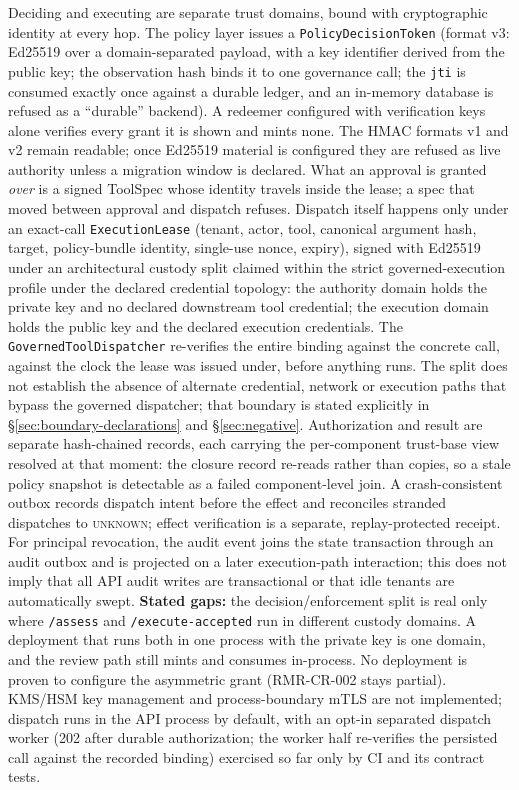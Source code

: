\documentclass[10pt,twocolumn]{article}
\begin{document}
Deciding and executing are separate trust domains, bound with
cryptographic identity at every hop. The policy layer issues a
\texttt{PolicyDecisionToken} (format v3: Ed25519 over a domain-separated
payload, with a key identifier derived from the public key; the observation
hash binds it to one governance call; the \texttt{jti} is consumed exactly
once against a durable ledger, and an in-memory database is refused as a
``durable'' backend). A redeemer configured with verification keys alone
verifies every grant it is shown and mints none. The HMAC formats v1 and v2
remain readable; once Ed25519 material is configured they are refused as
live authority unless a migration window is declared. What an approval is granted \emph{over} is a signed ToolSpec
whose identity travels inside the lease; a spec that moved between
approval and dispatch refuses. Dispatch itself happens only under an
exact-call \texttt{ExecutionLease} (tenant, actor, tool, canonical
argument hash, target, policy-bundle identity, single-use nonce,
expiry), signed with Ed25519 under an architectural custody split
claimed within the strict governed-execution profile under the declared
credential topology: the
authority domain holds the private key and no declared downstream tool
credential; the
execution domain holds the public key and the declared execution
credentials. The
\texttt{GovernedToolDispatcher} re-verifies the entire binding against
the concrete call, against the clock the lease was issued under, before
anything runs. The split does not establish the absence of alternate
credential, network or execution paths that bypass the governed
dispatcher; that boundary is stated explicitly in
\S\ref{sec:boundary-declarations} and \S\ref{sec:negative}. Authorization and result are separate hash-chained
records, each carrying the per-component trust-base view resolved at
that moment: the closure record re-reads rather than copies, so a
stale policy snapshot is detectable as a failed component-level join. A
crash-consistent outbox records dispatch intent before the effect and
reconciles stranded dispatches to \textsc{unknown}; effect verification
is a separate, replay-protected receipt. For principal revocation, the
audit event joins the state transaction through an audit outbox and is
projected on a later execution-path interaction; this does not imply
that all API audit writes are transactional or that idle tenants are
automatically swept. \textbf{Stated gaps:} the
decision/enforcement split is real only where \texttt{/assess} and
\texttt{/execute-accepted} run in different custody domains. A deployment
that runs both in one process with the private key is one domain, and the
review path still mints and consumes in-process. No deployment is proven to
configure the asymmetric grant (RMR-CR-002 stays partial). KMS/HSM key
management and process-boundary mTLS are not implemented; dispatch runs in the API process by default, with
an opt-in separated dispatch worker (202 after durable authorization;
the worker half re-verifies the persisted call against the recorded
binding) exercised so far only by CI and its contract tests.
\end{document}
